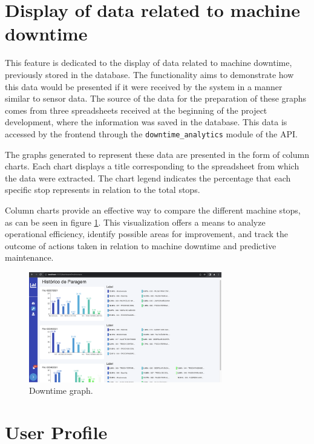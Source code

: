 \section[Display of data related to machine downtime]{Display of data related to machine downtime}\label{sec:downtime}

This feature is dedicated to the display of data related to machine downtime, previously stored in the database. The functionality aims to demonstrate how this data would be presented if it were received by the system in a manner similar to sensor data. The source of the data for the preparation of these graphs comes from three spreadsheets received at the beginning of the project development, where the information was saved in the database. This data is accessed by the frontend through the \texttt{downtime\_analytics} module of the \gls{API}.

The graphs generated to represent these data are presented in the form of column charts. Each chart displays a title corresponding to the spreadsheet from which the data were extracted. The chart legend indicates the percentage that each specific stop represents in relation to the total stops.

Column charts provide an effective way to compare the different machine stops, as can be seen in figure \ref{fig:downtime}. This visualization offers a means to analyze operational efficiency, identify possible areas for improvement, and track the outcome of actions taken in relation to machine downtime and predictive maintenance.

\begin{figure}[htbp]
	\centering
	\includegraphics[width=0.75\textwidth]{images/downtime.png}
	\caption{Downtime graph.}
	\label{fig:downtime}
\end{figure}

\section[User Profile]{User Profile}\label{sec:profile}

